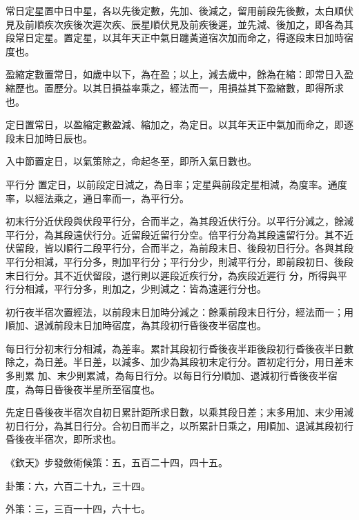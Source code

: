 \begin{pinyinscope}
 常日定星置中日中星，各以先後定數，先加、後減之，留用前段先後數，太白順伏見及前順疾次疾後次遲次疾、辰星順伏見及前疾後遲，並先減、後加之，即各為其段常日定星。置定星，以其年天正中氣日躔黃道宿次加而命之，得逐段末日加時宿度也。



 盈縮定數置常日，如歲中以下，為在盈；以上，減去歲中，餘為在縮：即常日入盈縮歷也。置歷分。以其日損益率乘之，經法而一，用損益其下盈縮數，即得所求也。



 定日置常日，以盈縮定數盈減、縮加之，為定日。以其年天正中氣加而命之，即逐段末日加時日辰也。



 入中節置定日，以氣策除之，命起冬至，即所入氣日數也。



 平行分
 置定日，以前段定日減之，為日率；定星與前段定星相減，為度率。通度率，以經法乘之，通日率而一，為平行分。



 初末行分近伏段與伏段平行分，合而半之，為其段近伏行分。以平行分減之，餘減平行分，為其段遠伏行分。近留段近留行分空。倍平行分為其段遠留行分。其不近伏留段，皆以順行二段平行分，合而半之，為前段末日、後段初日行分。各與其段平行分相減，平行分多，則加平行分；平行分少，則減平行分，即前段初日、後段末日行分。其不近伏留段，退行則以遲段近疾行分，為疾段近遲行
 分，所得與平行分相減，平行分多，則加之，少則減之：皆為遠遲行分也。



 初行夜半宿次置經法，以前段末日加時分減之：餘乘前段末日行分，經法而一；用順加、退減前段末日加時宿度，為其段初行昏後夜半宿度也。



 每日行分初末行分相減，為差率。累計其段初行昏後夜半距後段初行昏後夜半日數除之，為日差。半日差，以減多、加少為其段初末定行分。置初定行分，用日差末多則累
 加、末少則累減，為每日行分。以每日行分順加、退減初行昏後夜半宿度，為每日昏後夜半星所至宿度也。



 先定日昏後夜半宿次自初日累計距所求日數，以乘其段日差；末多用加、末少用減初日行分，為其日行分。合初日而半之，以所累計日乘之，用順加、退減其段初行昏後夜半宿次，即所求也。



 《欽天》步發斂術候策：五，五百二十四，四十五。



 卦策：六，六百二十九，三十四。



 外策：三，三百一十四，六十七。




\end{pinyinscope}
